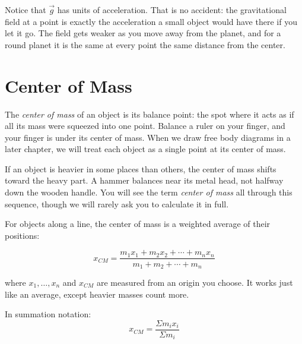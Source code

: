 Notice that $\vec g$ has units of acceleration. That is no accident: the gravitational field at a point is exactly the acceleration a small object would have there if you let it go. The field gets weaker as you move away from the planet, and for a round planet it is the same at every point the same distance from the center.

\section{Center of Mass}\label{sec:CoM}
The \emph{center of mass} of an object is its balance point: the spot where it acts as if all its mass were squeezed into one point. Balance a ruler on your finger, and your finger is under its center of mass. When we draw free body diagrams in a later chapter, we will treat each object as a single point at its center of mass.

If an object is heavier in some places than others, the center of mass shifts toward the heavy part. A hammer balances near its metal head, not halfway down the wooden handle. You will see the term \emph{center of mass} all through this sequence, though we will rarely ask you to calculate it in full.

For objects along a line, the center of mass is a weighted average of their positions:

\begin{mdframed}[style=important, frametitle={1-Dimensional Center of Mass}]
  $$x_{CM} = \frac{m_1x_1 + m_2x_2 + \cdots + m_nx_n}{m_1 + m_2 + \cdots + m_n}$$

  where $x_1, \dots, x_n$ and $x_{CM}$ are measured from an origin you choose. It works just like an average, except heavier masses count more.

  In summation notation:
  $$x_{CM} = \frac{\Sigma m_i x_i}{\Sigma m_i}$$
\end{mdframed}


